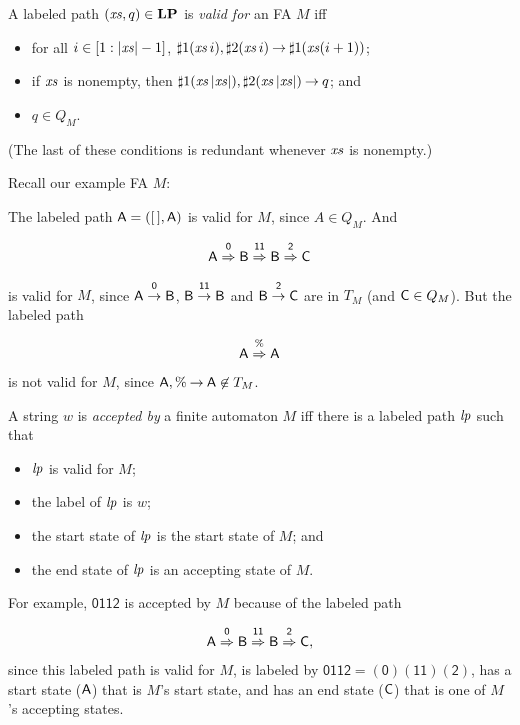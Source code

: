 %
A labeled path $({\it xs},q)\in\mathbf{LP}$ is \emph{valid for} an FA $M$ iff
\begin{itemize}
\item for all $i\in[1:|{\it xs}|-1]$, ${{\sharp}1}({\it xs}\,i),{{\sharp}2}({\it xs}\,i)\mathbin{\to}
  {{\sharp}1}({\it xs}(i+1))$;

\item if ${\it xs}$ is nonempty, then ${{\sharp}1}({\it xs}\,|{\it xs}|),{{\sharp}2}({\it xs}\,|{\it xs}|)\mathbin{\to}
  q$; and

\item $q\in Q_M$.
\end{itemize}
(The last of these conditions is redundant whenever ${\it xs}$ is nonempty.)

Recall our example FA $M$:
\begin{center}

\end{center}
The labeled path $\mathsf{A}=([\,],\mathsf{A})$ is valid for $M$,
since $A\in Q_M$.  And
\begin{gather*}
\mathsf{A}\stackrel{\strut\mathsf{0}}{\Rightarrow}\mathsf{B}\stackrel{\strut\mathsf{11}}{\Rightarrow}\mathsf{B}\stackrel{\strut\mathsf{2}}{\Rightarrow}\mathsf{C}
\end{gather*}
is valid for $M$, since $\mathsf{A}\stackrel{\strut\mathsf{0}}{\rightarrow}\mathsf{B}$,
$\mathsf{B}\stackrel{\strut\mathsf{11}}{\rightarrow}\mathsf{B}$ and $\mathsf{B}\stackrel{\strut\mathsf{2}}{\rightarrow}\mathsf{C}$ are in
$T_M$ (and $\mathsf{C}\in Q_M$). But the labeled path
\begin{gather*}
\mathsf{A}\stackrel{\strut\%}{\Rightarrow}\mathsf{A}
\end{gather*}
is not valid for $M$, since $\mathsf{A},\%\mathbin{\to}\mathsf{A}\not\in T_M$.

%
A string $w$ is \emph{accepted by} a finite automaton $M$ iff
there is a labeled path ${\it lp}$ such that
\begin{itemize}
\item ${\it lp}$ is valid for $M$;

\item the label of ${\it lp}$ is $w$;

\item the start state of ${\it lp}$ is the start state of $M$; and

\item the end state of ${\it lp}$ is an accepting state of $M$.
\end{itemize}
For example, $\mathsf{0112}$ is accepted by
$M$ because of the labeled path
\begin{gather*}
\mathsf{A}\stackrel{\strut\mathsf{0}}{\Rightarrow}\mathsf{B}\stackrel{\strut\mathsf{11}}{\Rightarrow}\mathsf{B}\stackrel{\strut\mathsf{2}}{\Rightarrow}\mathsf{C} ,
\end{gather*}
since this labeled path is valid for $M$, is labeled by $\mathsf{0112} =
\mathsf{(0)(11)(2)}$, has a start state ($\mathsf{A}$) that is $M$'s start state,
and has an end state ($\mathsf{C}$) that is one of $M$'s accepting states.

